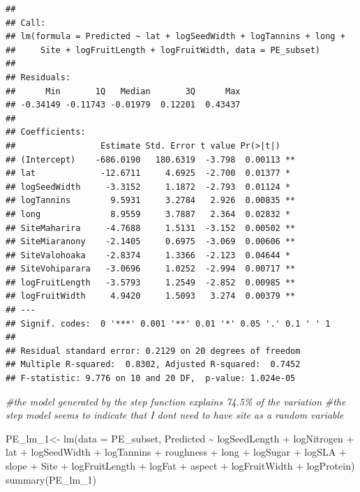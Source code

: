 \documentclass[
  12pt,
]{article}
\newenvironment{Shaded}{\begin{snugshade}}{\end{snugshade}}
\newcommand{\AttributeTok}[1]{\textcolor[rgb]{0.77,0.63,0.00}{#1}}
\newcommand{\CommentTok}[1]{\textcolor[rgb]{0.56,0.35,0.01}{\textit{#1}}}
\newcommand{\FunctionTok}[1]{\textcolor[rgb]{0.00,0.00,0.00}{#1}}
\newcommand{\NormalTok}[1]{#1}
\newcommand{\OtherTok}[1]{\textcolor[rgb]{0.56,0.35,0.01}{#1}}
\newcommand{\SpecialCharTok}[1]{\textcolor[rgb]{0.00,0.00,0.00}{#1}}
\begin{document}
\begin{verbatim}
## 
## Call:
## lm(formula = Predicted ~ lat + logSeedWidth + logTannins + long + 
##     Site + logFruitLength + logFruitWidth, data = PE_subset)
## 
## Residuals:
##      Min       1Q   Median       3Q      Max 
## -0.34149 -0.11743 -0.01979  0.12201  0.43437 
## 
## Coefficients:
##                 Estimate Std. Error t value Pr(>|t|)   
## (Intercept)    -686.0190   180.6319  -3.798  0.00113 **
## lat             -12.6711     4.6925  -2.700  0.01377 * 
## logSeedWidth     -3.3152     1.1872  -2.793  0.01124 * 
## logTannins        9.5931     3.2784   2.926  0.00835 **
## long              8.9559     3.7887   2.364  0.02832 * 
## SiteMaharira     -4.7688     1.5131  -3.152  0.00502 **
## SiteMiaranony    -2.1405     0.6975  -3.069  0.00606 **
## SiteValohoaka    -2.8374     1.3366  -2.123  0.04644 * 
## SiteVohiparara   -3.0696     1.0252  -2.994  0.00717 **
## logFruitLength   -3.5793     1.2549  -2.852  0.00985 **
## logFruitWidth     4.9420     1.5093   3.274  0.00379 **
## ---
## Signif. codes:  0 '***' 0.001 '**' 0.01 '*' 0.05 '.' 0.1 ' ' 1
## 
## Residual standard error: 0.2129 on 20 degrees of freedom
## Multiple R-squared:  0.8302, Adjusted R-squared:  0.7452 
## F-statistic: 9.776 on 10 and 20 DF,  p-value: 1.024e-05
\end{verbatim}

\begin{Shaded}
\begin{Highlighting}[]
\CommentTok{\#the model generated by the step function explains 74.5\% of the variation}
\CommentTok{\#the step model seems to indicate that I don\textquotesingle{}t need to have site as a random variable}

\NormalTok{PE\_lm\_1}\OtherTok{\textless{}{-}} \FunctionTok{lm}\NormalTok{(}\AttributeTok{data =}\NormalTok{ PE\_subset, Predicted }\SpecialCharTok{\textasciitilde{}}\NormalTok{ logSeedLength }\SpecialCharTok{+}\NormalTok{ logNitrogen }\SpecialCharTok{+}\NormalTok{ lat }\SpecialCharTok{+}\NormalTok{ logSeedWidth }\SpecialCharTok{+}\NormalTok{ logTannins }\SpecialCharTok{+}\NormalTok{ roughness }\SpecialCharTok{+}\NormalTok{ long }\SpecialCharTok{+}\NormalTok{ logSugar }\SpecialCharTok{+}\NormalTok{ logSLA }\SpecialCharTok{+}\NormalTok{ slope }\SpecialCharTok{+}\NormalTok{ Site }\SpecialCharTok{+}\NormalTok{ logFruitLength }\SpecialCharTok{+}\NormalTok{ logFat }\SpecialCharTok{+}\NormalTok{ aspect }\SpecialCharTok{+}\NormalTok{ logFruitWidth }\SpecialCharTok{+}\NormalTok{ logProtein)}
\FunctionTok{summary}\NormalTok{(PE\_lm\_1)}
\end{Highlighting}
\end{Shaded}
\end{document}
